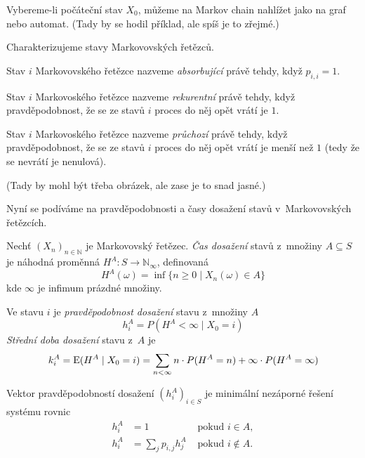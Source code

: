 Vybereme-li počáteční stav $X_0$, můžeme na Markov chain nahlížet jako na
graf nebo automat. (Tady by se hodil příklad, ale spíš je to zřejmé.)

Charakterizujeme stavy Markovovských řetězců.

\begin{definition}
    Stav $i$ Markovovského řetězce nazveme {\em absorbující}
    právě tehdy, když $p_{i,i} = 1$.
\end{definition}

\begin{definition}
    Stav $i$ Markovoského řetězce nazveme {\em rekurentní}
    právě tehdy, když pravděpodobnost, že se ze stavů $i$ proces do něj
    opět vrátí je $1$.
\end{definition}

\begin{definition}
    Stav $i$ Markovoského řetězce nazveme {\em průchozí}
    právě tehdy, když pravděpodobnost, že se ze stavů $i$ proces do něj
    opět vrátí je menší než $1$ (tedy že se nevrátí je nenulová).
\end{definition}

(Tady by mohl být třeba obrázek, ale zase je to snad jasné.)

Nyní se podíváme na pravděpodobnosti a časy dosažení stavů
v~Markovovských řetězcích.


\begin{definition}
    Nechť $(X_n)_{n \in \mathbb{N}}$ je Markovovský řetězec.
    {\em Čas dosažení} stavů z~množiny $A \subseteq S$ je
    náhodná proměnná $H^A : S \to \mathbb{N}_{\infty}$,
    definovaná
    \[
        H^A(\omega) = \inf \{ n \geq 0 \mid X_n(\omega) \in A \}
    \]
    kde $\infty$ je infimum prázdné množiny.
\end{definition}

\begin{definition}
    Ve stavu $i$ je
    {\em pravděpodobnost dosažení} stavu z~množiny $A$
    \[
        h^A_i = P(H^A < \infty \mid X_0 = i)
    \]
    {\em Střední doba dosažení} stavu z~$A$ je
    \[
        k^A_i = \operatorname{E}(H^A \mid X_0 = i)
        = \sum_{n < \infty} n \cdot P(H^A = n) + \infty \cdot P(H^A = \infty)
    \]
\end{definition}

\begin{theorem}
    Vektor pravděpodobností dosažení $(h^A_i)_{i \in S}$
    je minimální nezáporné řešení systému rovnic
    \begin{align*}
        h^A_i &= 1 &\text{ pokud } i \in A, \\
        h^A_i &= \sum_j p_{i,j} h^A_j &\text{ pokud } i \not \in A.
    \end{align*}
\end{theorem}

